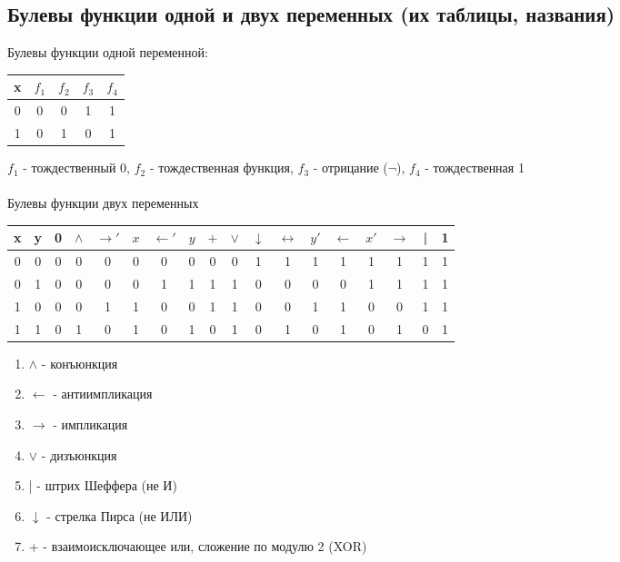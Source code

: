 \documentclass[a4paper]{article}
\theoremstyle{definition}
\theoremstyle{remark}
\begin{document}
    \subsection{Булевы функции одной и двух переменных (их таблицы, названия)}
        Булевы функции одной переменной:
         \begin{tabular}{c|cccc}
        x & $f_1$ & $f_2$ & $f_3$ & $f_4$ \\
        \hline
        0 & 0 & 0 & 1 & 1 \\
        1 & 0 & 1 & 0 & 1 \\ 
        \end{tabular}
    $f_1$ - тождественный 0, $f_2$ - тождественная функция, $f_3$ - отрицание ($\neg$), $f_4$ - тождественная 1
\\ \\
    Булевы функции двух переменных
    \begin{tabular}{cc|cccccccccccccccc}
        x & y & 0 & $\wedge$ & $\rightarrow '$ & $x$ & $\leftarrow '$ & $y$ & $+$ & $\vee$ & $\downarrow$ & $\leftrightarrow$ & $y'$ & $\leftarrow$ & $x'$ & $\rightarrow$ & | & 1\\
        \hline
        0 & 0 & 0 & 0 & 0 & 0 & 0 & 0 & 0 & 0 & 1 & 1 & 1 & 1 & 1 & 1 & 1 & 1 \\
        0 & 1 & 0 & 0 & 0 & 0 & 1 & 1 & 1 & 1 & 0 & 0 & 0 & 0 & 1 & 1 & 1 & 1 \\ 
        1 & 0 & 0 & 0 & 1 & 1 & 0 & 0 & 1 & 1 & 0 & 0 & 1 & 1 & 0 & 0 & 1 & 1 \\
        1 & 1 & 0 & 1 & 0 & 1 & 0 & 1 & 0 & 1 & 0 & 1 & 0 & 1 & 0 & 1 & 0 & 1 \\
        \end{tabular}
    \begin{enumerate}
        \item $\wedge$ - конъюнкция
        \item $\leftarrow$ -  антиимпликация
        \item $\rightarrow$ - импликация
        \item $\vee$ - дизъюнкция
        \item | - штрих Шеффера (не И)
        \item $\downarrow$ - стрелка Пирса (не ИЛИ)
        \item + -  взаимоисключающее или, сложение по модулю 2 (XOR)
    \end{enumerate}
\end{document}
